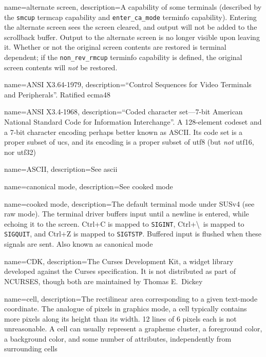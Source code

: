 {
  name={alternate screen},
  description={A capability of some terminals (described by the \texttt{smcup}
    termcap capability and \texttt{enter\_ca\_mode} terminfo capability). 
    Entering the alternate screen sees the screen cleared, and output will not
    be added to the scrollback buffer. Output to the alternate screen is no
    longer visible upon leaving it. Whether or not the original screen contents
    are restored is terminal dependent; if the \texttt{non\_rev\_rmcup}
    terminfo capability is defined, the original screen contents will \textit{not}
    be restored.}
}

{
  name={ANSI X3.64-1979},
  description={``Control Sequences for Video Terminals and Peripherals''.
    Ratified \Gls{ecma48}}
}

{
  name={ANSI X3.4-1968},
  description={``Coded character set---7-bit American National Standard Code
    for Information Interchange''. A 128-element codeset and a 7-bit character
    encoding perhaps better known as ASCII\cite{ascii}. Its code set is a
    proper subset of \Gls{ucs}, and its encoding is a proper subset of
    \gls{utf8} (but \textit{not} \gls{utf16}, nor \gls{utf32})}
}

{
  name={ASCII},
  description={See \Gls{ascii}}
}

{
  name={canonical mode},
  description={See \gls{cooked mode}}
}

{
  name={cooked mode},
description={The default terminal mode under SUSv4 (see \gls{raw mode}).
  The terminal driver buffers input until a newline is entered, while echoing
  it to the screen. Ctrl+C is mapped to \texttt{SIGINT}, Ctrl+\textbackslash\ is
  mapped to \texttt{SIGQUIT}, and Ctrl+Z is mapped to \texttt{SIGTSTP}.
  Buffered input is flushed when these signals are sent. Also known as
  \gls{canonical mode}}
}

{
  name={CDK},
description={The Curses Development Kit, a widget library developed against the
  Curses specification. It is not distributed as part of NCURSES, though
  both are maintained by Thomas E.\ Dickey}
}

{
  name={cell},
description={The rectilinear area corresponding to a given text-mode coordinate.
  The analogue of pixels in graphics mode, a cell typically contains more
  pixels along its height than its width. 12 lines of 6 pixels each is not
  unreasonable. A cell can usually represent a grapheme cluster, a foreground
  color, a background color, and some number of attributes, independently
  from surrounding cells}
}

